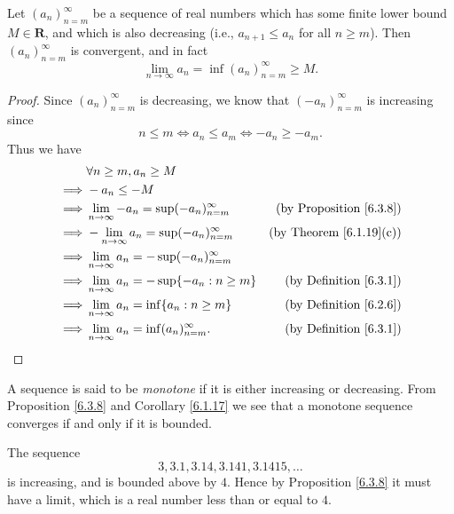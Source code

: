 \begin{additional corollary}\label{ac 6.3.1}
Let \((a_n)_{n = m}^\infty\) be a sequence of real numbers which has some finite lower bound \(M \in \mathbf{R}\), and which is also decreasing (i.e., \(a_{n + 1} \leq a_n\) for all \(n \geq m\)).
Then \((a_n)_{n = m}^\infty\) is convergent, and in fact
\[
    \lim_{n \to \infty} a_n = \inf(a_n)_{n = m}^\infty \geq M.
\]
\end{additional corollary}

\begin{proof}
    Since \((a_n)_{n = m}^\infty\) is decreasing, we know that \((-a_n)_{n = m}^\infty\) is increasing since
    \[
        n \leq m \iff a_n \leq a_m \iff -a_n \geq -a_m.
    \]
    Thus we have
    \begin{align*}
                 & \forall n \geq m, a_n \geq M                                                               \\
        \implies & -a_n \leq -M                                                                               \\
        \implies & \lim_{n \to \infty} -a_n = \sup(-a_n)_{n = m}^\infty & \text{(by Proposition \ref{6.3.8})} \\
        \implies & -\lim_{n \to \infty} a_n = \sup(-a_n)_{n = m}^\infty & \text{(by Theorem \ref{6.1.19}(c))} \\
        \implies & \lim_{n \to \infty} a_n = -\sup(-a_n)_{n = m}^\infty                                       \\
        \implies & \lim_{n \to \infty} a_n = -\sup\{-a_n : n \geq m\}   & \text{(by Definition \ref{6.3.1})}  \\
        \implies & \lim_{n \to \infty} a_n = \inf\{a_n : n \geq m\}     & \text{(by Definition \ref{6.2.6})}  \\
        \implies & \lim_{n \to \infty} a_n = \inf(a_n)_{n = m}^\infty.  & \text{(by Definition \ref{6.3.1})}
    \end{align*}
\end{proof}

\begin{note}
    A sequence is said to be \emph{monotone} if it is either increasing or decreasing.
    From Proposition \ref{6.3.8} and Corollary \ref{6.1.17} we see that a monotone sequence converges if and only if it is bounded.
\end{note}

\begin{example}\label{6.3.9}
    The sequence
    \[
        3, 3.1, 3.14, 3.141, 3.1415, \dots
    \]
    is increasing, and is bounded above by \(4\).
    Hence by Proposition \ref{6.3.8} it must have a limit, which is a real number less than or equal to \(4\).
\end{example}

